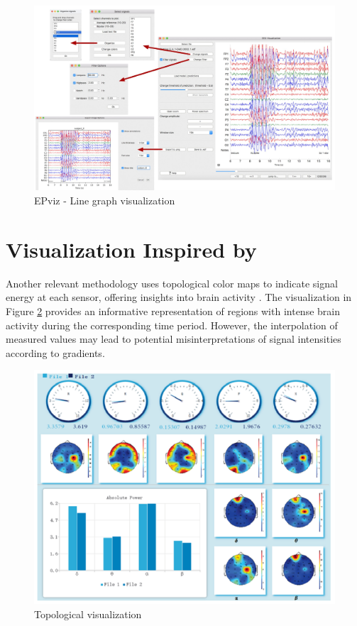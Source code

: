 \documentclass[format=acmtog]{acmart}
\begin{document}
	\begin{figure}
		\centering
		\includegraphics[width=\linewidth]{../presentation/images/epviz00}
		\caption{EPviz - Line graph visualization}
		\label{fig:epviz00}
	\end{figure}
	
	\section{Visualization Inspired by \cite{9098189}}
	Another relevant methodology uses topological color maps to indicate signal energy at each sensor, offering insights into brain activity \cite{9098189}. The visualization in Figure \ref{fig:visu01} provides an informative representation of regions with intense brain activity during the corresponding time period. However, the interpolation of measured values may lead to potential misinterpretations of signal intensities according to gradients.
	
	\begin{figure}
		\centering
		\includegraphics[width=\linewidth]{../presentation/images/visu01}
		\caption{Topological visualization}
		\label{fig:visu01}
	\end{figure}
	
\end{document}
